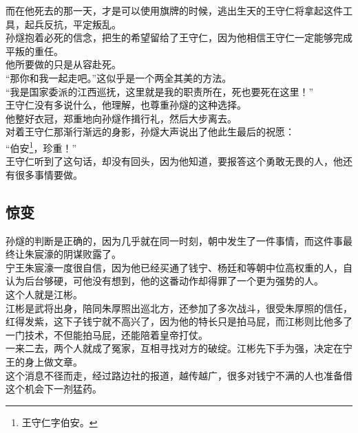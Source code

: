 \begin{multicols}{\theparacolNo}
而在他死去的那一天，才是可以使用旗牌的时候，逃出生天的王守仁将拿起这件工具，起兵反抗，平定叛乱。\\

孙燧抱着必死的信念，把生的希望留给了王守仁，因为他相信王守仁一定能够完成平叛的重任。\\

他所要做的只是从容赴死。\\

“那你和我一起走吧。”这似乎是一个两全其美的方法。\\

“我是国家委派的江西巡抚，这里就是我的职责所在，死也要死在这里！”\\

王守仁没有多说什么，他理解，也尊重孙燧的这种选择。\\

他整好衣冠，郑重地向孙燧作揖行礼，然后大步离去。\\

对着王守仁那渐行渐远的身影，孙燧大声说出了他此生最后的祝愿：\\

“伯安\footnote{王守仁字伯安。}，珍重！”\\

王守仁听到了这句话，却没有回头，因为他知道，要报答这个勇敢无畏的人，他还有很多事情要做。\\

\subsection{惊变}
孙燧的判断是正确的，因为几乎就在同一时刻，朝中发生了一件事情，而这件事最终让朱宸濠的阴谋败露了。\\

宁王朱宸濠一度很自信，因为他已经买通了钱宁、杨廷和等朝中位高权重的人，自认为后台够硬，可他没有想到，他的这番动作却得罪了一个更为强势的人。\\

这个人就是江彬。\\

江彬是武将出身，陪同朱厚照出巡北方，还参加了多次战斗，很受朱厚照的信任，红得发紫，这下子钱宁就不高兴了，因为他的特长只是拍马屁，而江彬则比他多了一门技术，不但能拍马屁，还能陪着皇帝打仗。\\

一来二去，两个人就成了冤家，互相寻找对方的破绽。江彬先下手为强，决定在宁王的身上做文章。\\

这个消息不径而走，经过路边社的报道，越传越广，很多对钱宁不满的人也准备借这个机会下一剂猛药。\\


\end{multicols}
